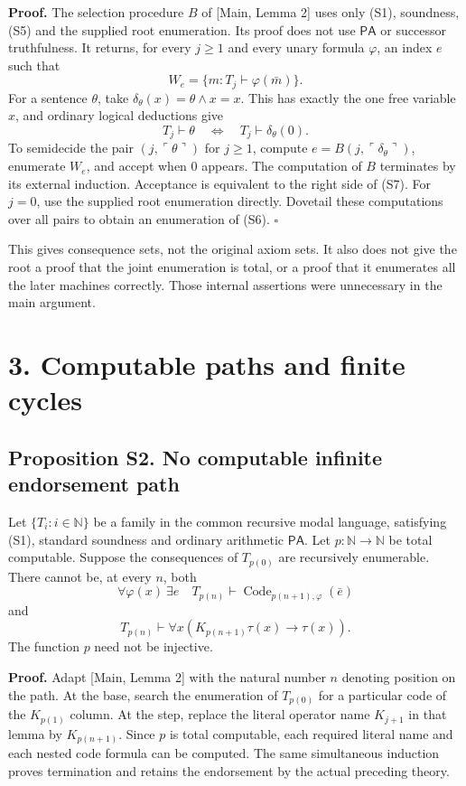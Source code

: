 \documentclass[
  11pt,
  letterpaper,
]{article}
\begin{document}
\textbf{Proof.} The selection procedure \(B\) of {[}Main, Lemma 2{]}
uses only (S1), soundness, (S5) and the supplied root enumeration. Its
proof does not use \(\mathsf{PA}\) or successor truthfulness. It
returns, for every \(j\geq1\) and every unary formula \(\varphi\), an
index \(e\) such that \[
W_e=\{m:T_j\vdash\varphi(\bar m)\}.
\] For a sentence \(\theta\), take
\(\delta_\theta(x)=\theta\wedge x=x\). This has exactly the one free
variable \(x\), and ordinary logical deductions give \[
T_j\vdash\theta
\quad\Longleftrightarrow\quad
T_j\vdash\delta_\theta(0).
\tag{S7}
\] To semidecide the pair \((j,\ulcorner\theta\urcorner)\) for
\(j\geq1\), compute \(e=B(j,\ulcorner\delta_\theta\urcorner)\),
enumerate \(W_e\), and accept when 0 appears. The computation of \(B\)
terminates by its external induction. Acceptance is equivalent to the
right side of (S7). For \(j=0\), use the supplied root enumeration
directly. Dovetail these computations over all pairs to obtain an
enumeration of (S6). \hfill\(\square\)

This gives consequence sets, not the original axiom sets. It also does
not give the root a proof that the joint enumeration is total, or a
proof that it enumerates all the later machines correctly. Those
internal assertions were unnecessary in the main argument.

\section{3. Computable paths and finite
cycles}\label{computable-paths-and-finite-cycles}

\subsection{Proposition S2. No computable infinite endorsement
path}\label{proposition-s2.-no-computable-infinite-endorsement-path}

Let \(\{T_i:i\in\mathbb N\}\) be a family in the common recursive modal
language, satisfying (S1), standard soundness and ordinary arithmetic
\(\mathsf{PA}\). Let \(p:\mathbb N\to\mathbb N\) be total computable.
Suppose the consequences of \(T_{p(0)}\) are recursively enumerable.
There cannot be, at every \(n\), both \[
\forall\varphi(x)\ \exists e\quad
T_{p(n)}\vdash
\operatorname{Code}_{p(n+1),\varphi}(\bar e)
\tag{S8}
\] and \[
T_{p(n)}\vdash
\forall x(K_{p(n+1)}\tau(x)\rightarrow\tau(x)).
\tag{S9}
\] The function \(p\) need not be injective.

\textbf{Proof.} Adapt {[}Main, Lemma 2{]} with the natural number \(n\)
denoting position on the path. At the base, search the enumeration of
\(T_{p(0)}\) for a particular code of the \(K_{p(1)}\) column. At the
step, replace the literal operator name \(K_{j+1}\) in that lemma by
\(K_{p(n+1)}\). Since \(p\) is total computable, each required literal
name and each nested code formula can be computed. The same simultaneous
induction proves termination and retains the endorsement by the actual
preceding theory.
\end{document}
